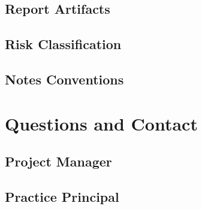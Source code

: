 \documentclass[11pt,a4paper]{article}
\begin{document}
\subsection{Report Artifacts}
\lipsum
\subsection{Risk Classification}
\lipsum
\subsection{Notes Conventions}
\lipsum

\section{Questions and Contact}
\subsection{Project Manager}
\lipsum
\subsection{Practice Principal}
\lipsum

\end{document}
